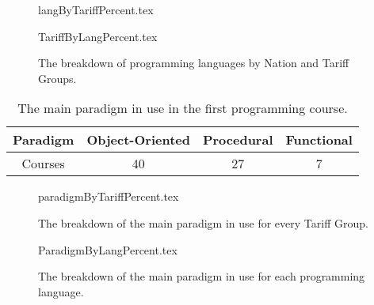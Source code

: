 \documentclass{sig-alternate}
\begin{document}
\begin{figure}
\begin{center}
{langByTariffPercent.tex}
\end{center}%
%
\begin{center}
{TariffByLangPercent.tex}
\end{center}\vskip-18pt
\caption{The breakdown of programming languages by Nation and Tariff Groups.\label{fig;LangTariff}}
\end{figure}

\begin{table}[]
\centering
\caption{The main paradigm in use in the first programming course.}
\label{tab:paradigm}
\begin{tabular}{cccc}
\hline
Paradigm & Object-Oriented & Procedural & Functional \\ \hline
Courses  & 40              & 27         & 7          \\ \hline
\end{tabular}
\end{table}


\begin{figure}\vskip-12pt
\begin{center}
{paradigmByTariffPercent.tex}
\end{center}\vskip-18pt
\caption{The breakdown of the main paradigm in use for every Tariff Group.}
\end{figure}

%


\begin{figure}
\begin{center}
{ParadigmByLangPercent.tex}
\end{center}\vskip-18pt
\caption{The breakdown of the main paradigm in use for each programming language.}
\end{figure}
\end{document}
